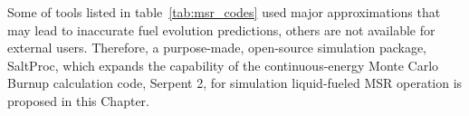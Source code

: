 Some of tools listed in table~\ref{tab:msr_codes} used major approximations 
that may lead to inaccurate fuel evolution predictions, others are not 
available for external users. Therefore, a purpose-made, open-source 
simulation package, SaltProc, which expands the capability of the 
continuous-energy Monte Carlo 
Burnup calculation code, Serpent 2, for simulation liquid-fueled \gls{MSR} 
operation is proposed in this Chapter.